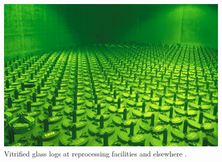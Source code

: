 \begin{figure}[htbp!]
\begin{center}
\begin{minipage}[t]{0.45\textwidth}
      \includegraphics[height=0.4\textheight]{logs.eps}
        \caption{Vitrified glass logs at reprocessing facilities and elsewhere 
          \cite{essick_photographing_2012}.}
        \label{fig:logs}
    \end{minipage}
    \end{center}
  \end{figure}
